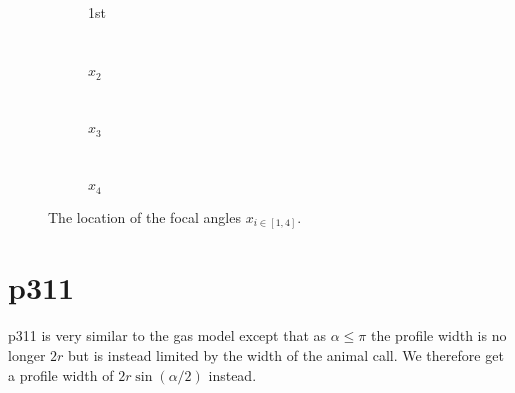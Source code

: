 \begin{figure}[t]
        \centering
        \begin{subfigure}[t]{0.25\textwidth}
                \centering
                \caption{1st}
                \label{f:tikz1}
        \end{subfigure}
        ~ 
        \begin{subfigure}[t]{0.25\textwidth}
                \centering
                \caption{$x_2$}
                \label{f:x2}
        \end{subfigure}
        ~ 
	\begin{subfigure}[t]{0.25\textwidth}
                \centering
                \caption{$x_3$}
                \label{f:x3}
        \end{subfigure}%
	~
	\begin{subfigure}[t]{0.25\textwidth}
                \centering
                \caption{$x_4$}
                \label{f:x4}
        \end{subfigure}%
\caption{The location of the focal angles $x_{i\in[1,4]}$.}
\label{f:xis}
\end{figure}


\section{p311} \label{p311}

p311 is very similar to the gas model except that as $\alpha \le \pi$ the profile width is no longer $2r$ but is instead limited by the width of the animal call. We therefore get a profile width of $2r\sin(\alpha/2)$ instead.



